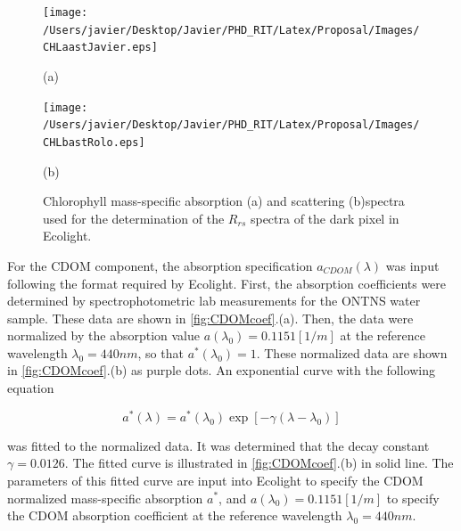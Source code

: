 \documentclass[onecolumn,3p,letterpaper]{elsarticle}
\begin{document}
\begin{figure}[htb]
  	\begin{minipage}[c]{0.48\linewidth}
    	\centering
  		\texttt{[image: /Users/javier/Desktop/Javier/PHD\_RIT/Latex/Proposal/Images/CHLaastJavier.eps]}
		\centerline{(a)}\medskip
  	\end{minipage}  
  	\hfill
  	\begin{minipage}[c]{0.48\linewidth}
    	\centering
  		\texttt{[image: /Users/javier/Desktop/Javier/PHD\_RIT/Latex/Proposal/Images/CHLbastRolo.eps]}
  		\centerline{(b)}\medskip
  	\end{minipage}	
  	\caption{Chlorophyll mass-specific absorption (a) and scattering (b)spectra used for the determination of the $R_{rs}$ spectra of the dark pixel in Ecolight. \label{fig:CHLcoef} } 
\end{figure}

For the CDOM component, the absorption specification $a_{CDOM}(\lambda)$ was input following the format required by Ecolight. First, the absorption coefficients were determined by spectrophotometric lab measurements for the ONTNS water sample. These data are shown in \autoref{fig:CDOMcoef}.(a). Then, the data were normalized by the absorption value $a(\lambda_0)=0.1151[1/m]$ at the reference wavelength $\lambda_0=440nm$, so that $a^*(\lambda_0)=1$. These normalized data are shown in \autoref{fig:CDOMcoef}.(b) as purple dots. An exponential curve with the following equation

\begin{equation}
	\label{eq:CDOMabs}
	a^*(\lambda)=a^*(\lambda_0)\exp{\left[-\gamma(\lambda-\lambda_0)\right]}
\end{equation}

\noindent was fitted to the normalized data. It was determined that the decay constant $\gamma=0.0126$. The fitted curve is illustrated in \autoref{fig:CDOMcoef}.(b) in solid line. The parameters of this fitted curve are input into Ecolight to specify the CDOM normalized mass-specific absorption $a^*$, and $a(\lambda_0)=0.1151[1/m]$ to specify the CDOM absorption coefficient at the reference wavelength $\lambda_0=440nm$.
\end{document}
